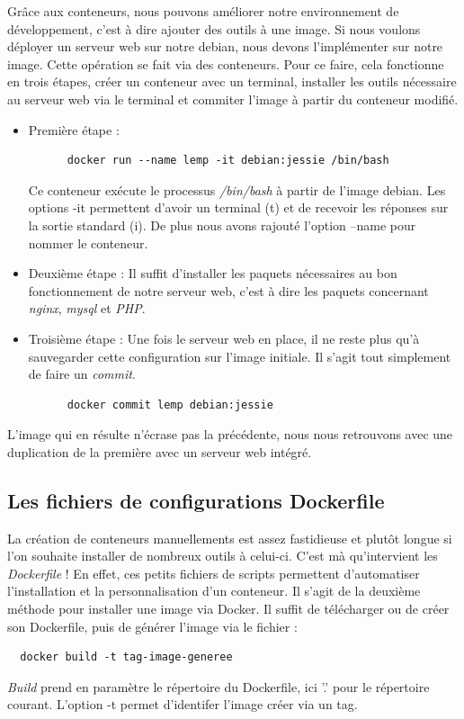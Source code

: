 \documentclass[12pt,a4paper]{article}
\begin{document}
Grâce aux conteneurs, nous pouvons améliorer notre environnement de développement, c'est à dire ajouter des outils à une image. Si nous voulons déployer un serveur web sur notre debian, nous devons l'implémenter sur notre image. Cette opération se fait via des conteneurs. Pour ce faire, cela fonctionne en trois étapes, créer un conteneur avec un terminal, installer les outils nécessaire au serveur web via le terminal et commiter l'image à partir du conteneur modifié.

\begin{itemize}
  \item{Première étape :}
    \begin{lstlisting}
      docker run --name lemp -it debian:jessie /bin/bash
    \end{lstlisting}
    Ce conteneur exécute le processus \textit{/bin/bash} à partir de l'image debian. Les options -it permettent d'avoir un terminal (t) et de recevoir les réponses sur la sortie standard (i). De plus nous avons rajouté l'option --name pour nommer le conteneur.

  \item{Deuxième étape :}
    Il suffit d'installer les paquets nécessaires au bon fonctionnement de notre serveur web, c'est à dire les paquets concernant \textit{nginx}, \textit{mysql} et \textit{PHP}.

  \item{Troisième étape :}
    Une fois le serveur web en place, il ne reste plus qu'à sauvegarder cette configuration sur l'image initiale. Il s'agit tout simplement de faire un \textit{commit}.
    \begin{lstlisting}
      docker commit lemp debian:jessie
    \end{lstlisting}
\end{itemize}

L'image qui en résulte n'écrase pas la précédente, nous nous retrouvons avec une duplication de la première avec un serveur web intégré.

\subsection{Les fichiers de configurations Dockerfile}

La création de conteneurs manuellements est assez fastidieuse et plutôt longue si l'on souhaite installer de nombreux outils à celui-ci. C'est mà qu'intervient les \textit{Dockerfile} ! En effet, ces petits fichiers de scripts permettent d'automatiser l'installation et la personnalisation d'un conteneur. Il s'agit de la deuxième méthode pour installer une image via Docker. Il suffit de télécharger ou de créer son Dockerfile, puis de générer l'image via le fichier :
\begin{lstlisting}
  docker build -t tag-image-generee
\end{lstlisting}
\textit{Build} prend en paramètre le répertoire du Dockerfile, ici '.' pour le répertoire courant. L'option -t permet d'identifer l'image créer via un tag.
\end{document}
